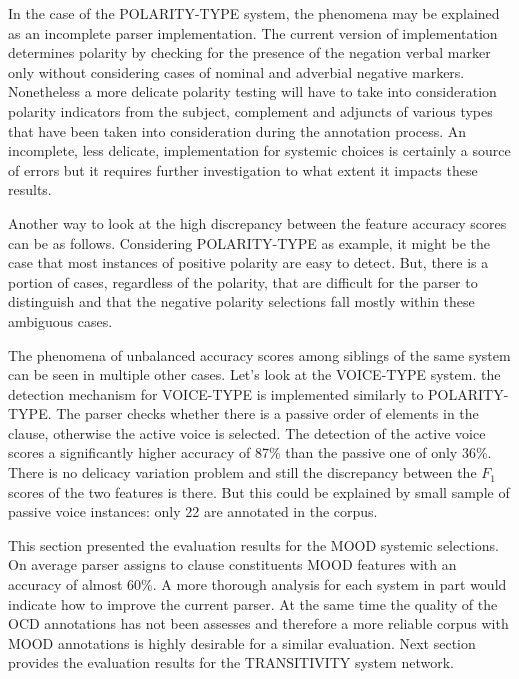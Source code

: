     In the case of the POLARITY-TYPE system, the phenomena may be explained as an incomplete parser implementation. The current version of implementation determines polarity by checking for the presence of the negation verbal marker only without considering cases of nominal and adverbial negative markers. Nonetheless a more delicate polarity testing will have to take into consideration polarity indicators from the subject, complement and adjuncts of various types that have been taken into consideration during the annotation process. An incomplete, less delicate, implementation for systemic choices is certainly a source of errors but it requires further investigation to what extent it impacts these results. %
    
    Another way to look at the high discrepancy between the feature accuracy scores can be as follows. Considering POLARITY-TYPE as example, it might be the case that most instances of positive polarity are easy to detect. But, there is a portion of cases, regardless of the polarity, that are difficult for the parser to distinguish and that the negative polarity selections fall mostly within these ambiguous cases. %
    
    The phenomena of unbalanced accuracy scores among siblings of the same system can be seen in multiple other cases. Let's look at the VOICE-TYPE system. the detection mechanism for VOICE-TYPE is implemented similarly to POLARITY-TYPE. The parser checks whether there is a passive order of elements in the clause, otherwise the active voice is selected.
    The detection of the active voice scores a significantly higher accuracy of 87\% than the passive one of only 36\%. There is no delicacy variation problem and still the discrepancy between the $F_1$ scores of the two features is there. But this could be explained by small sample of passive voice instances: only 22 are annotated in the corpus. 

    This section presented the evaluation results for the MOOD systemic selections. On average parser assigns to clause constituents MOOD features with an accuracy of almost 60\%. A more thorough analysis for each system in part would indicate how to improve the current parser. At the same time the quality of the OCD annotations has not been assesses and therefore a more reliable corpus with MOOD annotations is highly desirable for a similar evaluation. Next section provides the evaluation results for the TRANSITIVITY system network. 

